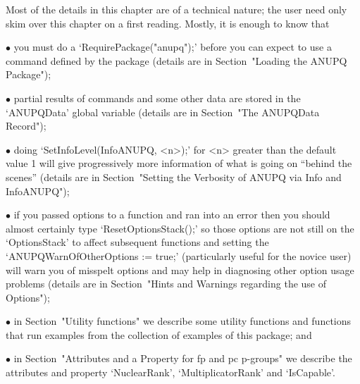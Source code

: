 

Most of the details in this chapter are of a technical nature;  the  user
need only skim over this chapter on a first reading. Mostly, it is enough
to know that

\beginlist%

\item{$\bullet$} 
you must do a `RequirePackage("anupq");' before you can expect to  use  a
command defined by the {\ANUPQ} package (details are in  Section~"Loading
the ANUPQ Package");

\item{$\bullet$}
partial results of {\ANUPQ} commands and some other data  are  stored  in
the `ANUPQData' global variable (details are  in  Section~"The  ANUPQData
Record"); 

\item{$\bullet$} 
doing `SetInfoLevel(InfoANUPQ, <n>);' for <n> greater  than  the  default
value 1 will give progressively more information  of  what  is  going  on
``behind the scenes'' (details are in Section~"Setting the  Verbosity  of
ANUPQ via Info and InfoANUPQ");

\item{$\bullet$} 
if you passed options to a function and ran into an error then you should
almost certainly type `ResetOptionsStack();' so  those  options  are  not
still on the `OptionsStack' to affect subsequent  functions  and  setting
the `ANUPQWarnOfOtherOptions  :=  true;'  (particularly  useful  for  the
novice user) will warn you of misspelt options and may help in diagnosing
other option usage problems (details are in Section~"Hints  and  Warnings
regarding the use of Options");

\item{$\bullet$} 
in  Section~"Utility functions"  we describe  some utility  functions and
functions  that run  examples from  the  collection of  examples of  this
package; and

\item{$\bullet$} 
in Section~"Attributes and a Property for fp and pc p-groups" we describe
the  attributes  and   property  `NuclearRank',  `MultiplicatorRank'  and
`IsCapable'.

